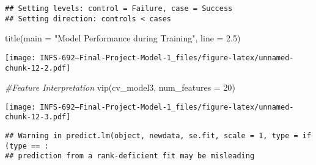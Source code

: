 \documentclass[
]{article}
\newenvironment{Shaded}{\begin{snugshade}}{\end{snugshade}}
\newcommand{\AttributeTok}[1]{\textcolor[rgb]{0.77,0.63,0.00}{#1}}
\newcommand{\CommentTok}[1]{\textcolor[rgb]{0.56,0.35,0.01}{\textit{#1}}}
\newcommand{\DecValTok}[1]{\textcolor[rgb]{0.00,0.00,0.81}{#1}}
\newcommand{\FloatTok}[1]{\textcolor[rgb]{0.00,0.00,0.81}{#1}}
\newcommand{\FunctionTok}[1]{\textcolor[rgb]{0.00,0.00,0.00}{#1}}
\newcommand{\NormalTok}[1]{#1}
\newcommand{\OtherTok}[1]{\textcolor[rgb]{0.56,0.35,0.01}{#1}}
\newcommand{\SpecialCharTok}[1]{\textcolor[rgb]{0.00,0.00,0.00}{#1}}
\newcommand{\StringTok}[1]{\textcolor[rgb]{0.31,0.60,0.02}{#1}}
\begin{document}
\begin{verbatim}
## Setting levels: control = Failure, case = Success
## Setting direction: controls < cases
\end{verbatim}

\begin{Shaded}
\begin{Highlighting}[]
\FunctionTok{title}\NormalTok{(}\AttributeTok{main =} \StringTok{"Model Performance during Training"}\NormalTok{, }\AttributeTok{line =} \FloatTok{2.5}\NormalTok{)}
\end{Highlighting}
\end{Shaded}

\texttt{[image: INFS-692---Final-Project-Model-1\_files/figure-latex/unnamed-chunk-12-2.pdf]}

\begin{Shaded}
\begin{Highlighting}[]
\CommentTok{\#Feature Interpretation}
\FunctionTok{vip}\NormalTok{(cv\_model3, }\AttributeTok{num\_features =} \DecValTok{20}\NormalTok{)}
\end{Highlighting}
\end{Shaded}

\texttt{[image: INFS-692---Final-Project-Model-1\_files/figure-latex/unnamed-chunk-12-3.pdf]}

\begin{Shaded}
\end{Shaded}

\begin{verbatim}
## Warning in predict.lm(object, newdata, se.fit, scale = 1, type = if (type == :
## prediction from a rank-deficient fit may be misleading
\end{verbatim}
\end{document}

